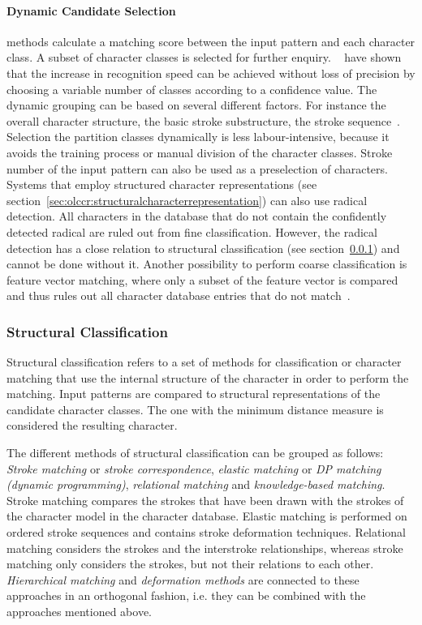 \paragraph{Dynamic Candidate Selection} methods calculate a matching score between 
the input pattern and each character class. A subset of character classes is 
selected for further enquiry. ~ have shown that the 
increase in recognition speed can be achieved without loss of precision by 
choosing a variable number of classes according to a confidence value.
The dynamic grouping can be based on several different factors. For instance
the overall character structure, the basic stroke substructure, the stroke 
sequence~.
Selection the partition classes dynamically is less labour-intensive, because it
avoids the training process or manual division of the character classes.
Stroke number of the input pattern can also be used as a preselection of
characters. Systems that employ structured character representations (see 
section~\ref{sec:olccr:structuralcharacterrepresentation}) can also use radical 
detection. All characters in the database that do not contain the confidently 
detected radical are ruled out from fine classification. However, the radical
detection has a close relation to structural classification (see 
section~\ref{sec:olccr:structuralclassification}) and cannot be done without it.
Another possibility to perform coarse classification is feature vector matching,
where only a subset of the feature vector is compared and thus rules out all
character database entries that do not match~.

\subsubsection{Structural Classification}
\label{sec:olccr:structuralclassification}

Structural classification refers to a set of methods for classification or
character matching that use the internal structure of the character in order to
perform the matching. Input patterns are compared to structural representations
of the candidate character classes.
The one with the minimum distance measure is considered the resulting character.

The different methods of structural classification can be grouped as follows:\\
\emph{Stroke matching} or \emph{stroke correspondence}, 
\emph{elastic matching} or \emph{DP matching (dynamic programming)}, 
\emph{relational matching} and \emph{knowledge-based matching}.
Stroke matching compares the strokes that have been drawn with the strokes of the
character model in the character database. Elastic matching is performed on 
ordered stroke sequences and contains stroke deformation techniques. 
Relational matching considers the strokes and the interstroke relationships, 
whereas stroke matching only considers the strokes, but not their relations 
to each other. \emph{Hierarchical matching} and \emph{deformation methods} are 
connected to these approaches in an orthogonal fashion, i.e. they can be combined
with the approaches mentioned above.

